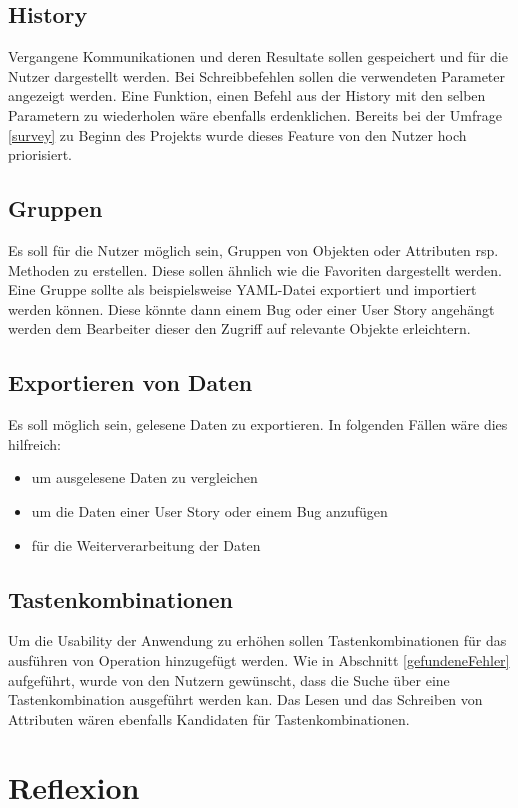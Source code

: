 \subsection{History}
Vergangene Kommunikationen und deren Resultate sollen gespeichert und für die Nutzer dargestellt werden.
Bei Schreibbefehlen sollen die verwendeten Parameter angezeigt werden.
Eine Funktion, einen Befehl aus der History mit den selben Parametern zu wiederholen wäre ebenfalls erdenklichen.
Bereits bei der Umfrage \ref{survey} zu Beginn des Projekts wurde dieses Feature von den Nutzer hoch priorisiert.

\subsection{Gruppen}
Es soll für die Nutzer möglich sein, Gruppen von Objekten oder Attributen rsp. Methoden zu erstellen.
Diese sollen ähnlich wie die Favoriten dargestellt werden.
Eine Gruppe sollte als beispielsweise \ac{YAML}-Datei exportiert und importiert werden können.
Diese könnte dann einem Bug oder einer User Story angehängt werden dem Bearbeiter dieser den Zugriff auf relevante Objekte erleichtern.

\subsection{Exportieren von Daten}
Es soll möglich sein, gelesene Daten zu exportieren.
In folgenden Fällen wäre dies hilfreich:
\begin{itemize}
   \item um ausgelesene Daten zu vergleichen
   \item um die Daten einer User Story oder einem Bug anzufügen
   \item für die Weiterverarbeitung der Daten
\end{itemize}

\subsection{Tastenkombinationen}
Um die Usability der Anwendung zu erhöhen sollen Tastenkombinationen für das ausführen von Operation hinzugefügt werden.
Wie in Abschnitt \ref{gefundeneFehler} aufgeführt, wurde von den Nutzern gewünscht, dass die Suche über eine Tastenkombination ausgeführt werden kan.
Das Lesen und das Schreiben von Attributen wären ebenfalls Kandidaten für Tastenkombinationen.







\section{Reflexion}
